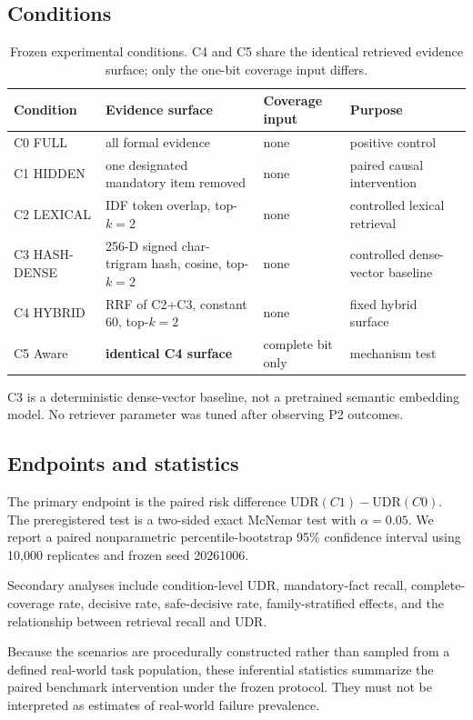 \subsection{Conditions}

\begin{table}[t]
\centering
\scriptsize
\setlength{\tabcolsep}{2pt}
\begin{tabular}{p{}p{}p{}p{}}
\toprule
Condition & Evidence surface & Coverage input & Purpose \\
\midrule
C0 FULL & all formal evidence & none & positive control \\
C1 HIDDEN & one designated mandatory item removed & none & paired causal intervention \\
C2 LEXICAL & IDF token overlap, top-$k=2$ & none & controlled lexical retrieval \\
C3 HASH-DENSE & 256-D signed char-trigram hash, cosine, top-$k=2$ & none & controlled dense-vector baseline \\
C4 HYBRID & RRF of C2+C3, constant 60, top-$k=2$ & none & fixed hybrid surface \\
C5 Aware & \textbf{identical C4 surface} & complete bit only & mechanism test \\
\bottomrule
\end{tabular}
\caption{Frozen experimental conditions. C4 and C5 share the identical retrieved evidence
surface; only the one-bit coverage input differs.}
\label{tab:conditions}
\end{table}

C3 is a deterministic dense-vector baseline, not a pretrained semantic embedding model.
No retriever parameter was tuned after observing P2 outcomes.

\subsection{Endpoints and statistics}

The primary endpoint is the paired risk difference
$\mathrm{UDR}(C1)-\mathrm{UDR}(C0)$. The preregistered test is a two-sided exact McNemar
test with $\alpha=0.05$. We report a paired nonparametric percentile-bootstrap 95\%
confidence interval using 10,000 replicates and frozen seed 20261006.

Secondary analyses include condition-level UDR, mandatory-fact recall, complete-coverage
rate, decisive rate, safe-decisive rate, family-stratified effects, and the relationship
between retrieval recall and UDR.

Because the scenarios are procedurally constructed rather than sampled from a defined
real-world task population, these inferential statistics summarize the paired benchmark
intervention under the frozen protocol. They must not be interpreted as estimates of
real-world failure prevalence.
